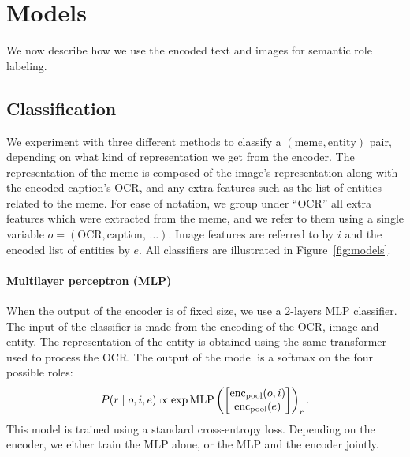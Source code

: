\section{Models}
\label{sec:models}
\begin{figure*}
	\centering
	
	\caption{%
	    Our three classifiers.
	    Note that each classifier uses a different combination of encoders.
	    MLP is used with \encoder[pool], Attention requires \encoder[full], while Seq2seq requires an -- pair.
	}
	\label{fig:models}
\end{figure*}

We now describe how we use the encoded text and images for semantic role labeling.

\subsection{Classification}
\label{sec:classification}
We experiment with three different methods to classify a \((\text{meme}, \text{entity})\) pair, depending on what kind of representation we get from the encoder.
The representation of the meme is composed of the image's representation along with the encoded caption's OCR, and any extra features such as the list of entities related to the meme.
For ease of notation, we group under ``OCR'' all extra features which were extracted from the meme, and we refer to them using a single variable \(o = (\text{OCR}, \text{caption, }\dotsc)\). Image features are referred to by  \(i\) and the encoded list of entities by  \(e\).
All classifiers are illustrated in Figure~\ref{fig:models}.

\paragraph{Multilayer perceptron (MLP)}
When the output of the encoder is of fixed size, we use a 2-layers MLP classifier.
The input of the classifier is made from the encoding of the OCR, image and entity.
The representation of the entity is obtained using the same transformer used to process the OCR.
The output of the model is a softmax on the four possible roles:
\begin{equation*}
	P(r\mid o, i, e) \propto \exp \operatorname{MLP}\left(\begin{bmatrix}\encoder[pool](o, i)\\\encoder[pool](e)\end{bmatrix}\right)_r.
\end{equation*}
This model is trained using a standard cross-entropy loss.
Depending on the encoder, we either train the MLP alone, or the MLP and the encoder jointly.

